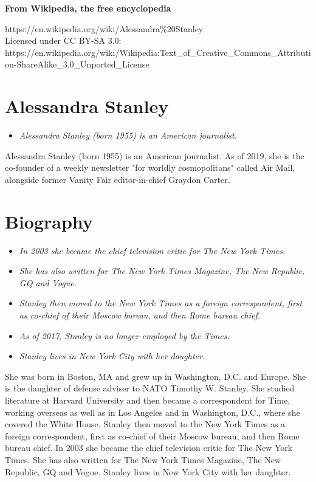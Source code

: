 \textbf{From Wikipedia, the free encyclopedia}

https://en.wikipedia.org/wiki/Alessandra\%20Stanley\\
Licensed under CC BY-SA 3.0:\\
https://en.wikipedia.org/wiki/Wikipedia:Text\_of\_Creative\_Commons\_Attribution-ShareAlike\_3.0\_Unported\_License

\section{Alessandra Stanley}\label{alessandra-stanley}

\begin{itemize}
\item
  \emph{Alessandra Stanley (born 1955) is an American journalist.}
\end{itemize}

Alessandra Stanley (born 1955) is an American journalist. As of 2019,
she is the co-founder of a weekly newsletter "for worldly cosmopolitans"
called Air Mail, alongside former Vanity Fair editor-in-chief Graydon
Carter.

\section{Biography}\label{biography}

\begin{itemize}
\item
  \emph{In 2003 she became the chief television critic for The New York
  Times.}
\item
  \emph{She has also written for The New York Times Magazine, The New
  Republic, GQ and Vogue.}
\item
  \emph{Stanley then moved to the New York Times as a foreign
  correspondent, first as co-chief of their Moscow bureau, and then Rome
  bureau chief.}
\item
  \emph{As of 2017, Stanley is no longer employed by the Times.}
\item
  \emph{Stanley lives in New York City with her daughter.}
\end{itemize}

She was born in Boston, MA and grew up in Washington, D.C. and Europe.
She is the daughter of defense adviser to NATO Timothy W. Stanley. She
studied literature at Harvard University and then became a correspondent
for Time, working overseas as well as in Los Angeles and in Washington,
D.C., where she covered the White House. Stanley then moved to the New
York Times as a foreign correspondent, first as co-chief of their Moscow
bureau, and then Rome bureau chief. In 2003 she became the chief
television critic for The New York Times. She has also written for The
New York Times Magazine, The New Republic, GQ and Vogue. Stanley lives
in New York City with her daughter.

